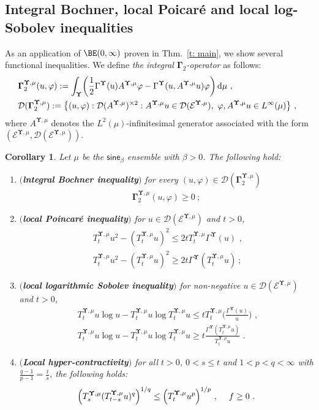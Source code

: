 \documentclass[11pt,letterpaper]{amsart}
\newcommand{\dom}[1]{\mathcal D(#1)}
\let\temp\phi
\let\phi\varphi
\let\varphi\temp
\newcommand{\diff}{\mathop{}\!\mathrm{d}}
\newcommand{\comma}{\,\,\mathrm{,}\;\,}
\newcommand{\fstop}{\,\,\mathrm{.}}
\newcommand{\cdc}{\Gamma}
\newcommand{\QP}{{\mu}}
\newcommand{\dUpsilon}{{\mathbf \Upsilon}}
\newcommand{\U}{\dUpsilon}
\newcommand{\sine}{\mathsf{sine}}
\newcommand{\E}{\mathcal E}
\renewcommand{\1}{\mathbf 1}
\numberwithin{equation}{section}
\theoremstyle{plain}
\newtheorem{cor}[thm]{Corollary}%
\theoremstyle{definition}
\theoremstyle{remark}
\begin{document}
\subsection{Integral Bochner, local Poicar\'e and local log-Sobolev inequalities} \label{sec:AP1}
As an application of $\BE(0,\infty)$ proven in Thm.~\ref{t: main}, we show several functional inequalities.
We define {\it the integral $\mathbf \Gamma_2$-operator} as follows:
\begin{align} \label{d:IG}
&\mathbf \Gamma_2^{\U, \QP}(u, \phi):=\int_{\U}\biggl( \frac{1}{2}\cdc^{\U}(u)A^{\U, \QP} \phi - \cdc^{\U}(u, A^{\U, \QP}u) \phi\biggr) \diff \QP \comma
\\
&\dom{\mathbf \Gamma_2^{\U, \QP}}:=\bigl\{(u, \phi): \dom{A^{\U, \QP}}^{\times 2}: A^{\U, \QP}u \in \dom{\E^{\U, \QP}},\ \phi, A^{\U, \QP}u  \in L^\infty(\QP) \bigr\} \comma \notag
\end{align}
where $A^{\U, \QP}$ denotes the $L^2(\QP)$-infinitesimal generator associated with the form~$(\E^{\U, \QP}, \dom{\E^{\U, \QP}})$.
\begin{cor}\label{t:LPS}
Let $\mu$ be the $\sine_\beta$ ensemble with $\beta>0$.  The following  hold:
\begin{enumerate}[{\rm (a)}]
\item$(${\bf lntegral Bochner inequality}$)$ for every $(u, \phi) \in \dom{\mathbf \cdc^{\U, \QP}_2}$
\begin{align*}
\mathbf \cdc^{\U, \QP}_2(u, \phi) \ge 0 \ ;
\end{align*}
\item $(${\bf local Poincar\'e inequality}$)$  for $u \in \dom{\E^{\U, \QP}}$ and $t >0$,
\begin{align*}
&T^{\U, \QP}_tu^2- (T^{\U, \QP}_tu)^2 \le 2tT^{\U, \QP}_t\cdc^{\U}(u)  \comma
\\
&T^{\U, \QP}_tu^2- (T^{\U, \QP}_tu)^2 \ge 2t\cdc^{\U} (T^{\U, \QP}_tu) \ ;
\end{align*}

\item $(${\bf  local logarithmic Sobolev inequality}$)$ for non-negative $u \in \dom{\E^{\U, \QP}}$ and $t>0$,
\begin{align*}
&T^{\U, \QP}_tu\log u- T^{\U, \QP}_tu\log T^{\U, \QP}_t u \le tT^{\U, \QP}_t\biggl( \frac{\cdc^{\U}(u)}{u} \biggr) \comma
\\
&T^{\U, \QP}_tu\log u- T^{\U, \QP}_tu\log T^{\U, \QP}_t u \ge t \frac{\cdc^{\U}(T^{\U, \QP}_t u)}{T^{\U, \QP}_t u}  \fstop
\end{align*}
\item $(${\bf Local hyper-contractivity}$)$ for all $t>0$, $0<s\le t$ and $1<p<q<\infty$ with $\frac{q-1}{p-1}=\frac{t}{s}$, the following holds:
$$\Bigl( T_s^{\U, \QP}(T^{\U, \QP}_{t-s}u)^{q}\Bigr)^{1/q} \le \Bigl( T_t^{\U, \QP}u^p\Bigr)^{1/p} \comma\quad f \ge 0 \fstop$$
\end{enumerate}
\end{cor}
\end{document}
